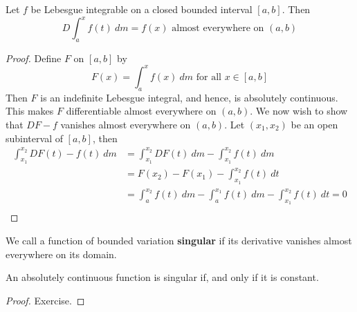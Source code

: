 \begin{theorem}\label{11.3.4}
    Let $f$ be Lebesgue integrable on a closed bounded interval $[a,b]$. Then
    \begin{equation*}
        D{\int_a^x{f(t)} \ dm}=f(x) \text{ almost everywhere on } (a,b)
    \end{equation*}
\end{theorem}
\begin{proof}
    Define $F$ on  $[a,b]$ by
    \begin{equation*}
        F(x)=\int_a^x{f(x) \ dm} \text{ for all } x \in [a,b]
    \end{equation*}
    Then $F$ is an indefinite Lebesgue integral, and hence, is absolutely
    continuous. This makes  $F$ differentiable almost everywhere on  $(a,b)$. We
    now wish to show that $D{F}-f$ vanishes almost everywhere on $(a,b)$. Let
    $(x_1,x_2)$ be an open subinterval of $[a,b]$, then
    \begin{align*}
        \int_{x_1}^{x_2}{D{F(t)}-f(t) \ dm} &=
                \int_{x_1}^{x_2}{D{F(t)} \ dm}-\int_{x_1}^{x_2}{f(t) \ dm}  \\
                &= F(x_2)-F(x_1)-\int_{x_1}^{x_2}{f(t) \ dt}    \\
                &= \int_a^{x_2}{f(t) \ dm}-\int_a^{x_1}{f(t) \ dm}
                            -\int_{x_1}^{x_2}{f(t) \ dt}=0    \\
    \end{align*}
\end{proof}

\begin{definition}
    We call a function of bounded variation \textbf{singular} if its derivative
    vanishes almost everywhere on its domain.
\end{definition}

\begin{lemma}\label{11.3.5}
    An absolutely continuous function is singular if, and only if it is
    constant.
\end{lemma}
\begin{proof}
    Exercise.
\end{proof}

